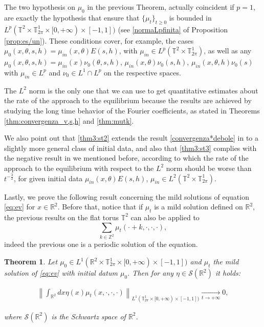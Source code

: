 \documentclass[a4paper,10pt,reqno]{amsart}
\newtheorem{theorem}{Theorem}[section]
\numberwithin{equation}{subsection}
\numberwithin{figure}{subsection}
\begin{document}
The two hypothesis on $\mu_0$ in the previous Theorem, actually coincident if $p=1$, are exactly the hypothesis that ensure that $\{\mu_t\}_{t\geq0}$ is bounded in $L^p(\mathbb{T}^2\times\mathbb{T}^1_{2\pi}\times[0,+\infty)\times[-1,1])$ (see \eqref{normaLpfinita} of Proposition \ref{prop:es/un}). These conditions cover, for example, the cases $\mu_0(x,\theta,s,h)=\mu_{in}(x,\theta)E(s,h)$, with $\mu_{in}\in L^p(\mathbb{T}^2\times\mathbb{T}^1_{2\pi})$, as well as any $\mu_0(x,\theta,s,h)=\mu_{in}(x)\nu_0(\theta,s,h)$, $\mu_{in}(x,\theta)\nu_0(s,h)$, $\mu_{in}(x,\theta,h)\nu_0(s)$ with $\mu_{in}\in L^p$ and $\nu_0\in L^1\cap L^p$ on the respective spaces.

The $L^2$ norm is the only one that we can use to get quantitative estimates about the rate of the approach to the equilibrium because the results are achieved by studying the long time behavior of the Fourier coefficients, as stated in Theorems \ref{thm:convergenza_v,s,h} and \ref{thm:mutk}.

We also point out that \eqref{thm3:st2} extends the result \eqref{convergenza*debole} in \cite{CG2010} to a slightly more general class of initial data, and also that \eqref{thm3:st3} complies with the negative result in \cite{CG2010} we mentioned before, according to which the rate of the approach to the equilibrium with respect to the $L^2$ norm should be worse than $t^{-\frac{3}{2}}$, for given initial data $\mu_{in}(x,\theta)E(s,h)$, $\mu_{in}\in L^2(\mathbb{T}^2\times\mathbb{T}^1_{2\pi})$.

Lastly, we prove the following result concerning the mild solutions of equation \eqref{eq:ev} for $x\in\mathbb{R}^2$. Before that, notice that if $\mu_t$ is a mild solution defined on $\mathbb{R}^2$, the previous results on the flat torus $\mathbb{T}^2$ can also be applied to 
\[
\sum_{k\in\mathbb{Z}^2}\mu_t(\cdot+k,\cdot,\cdot,\cdot),
\]
indeed the previous one is a periodic solution of the equation.
\begin{theorem}\label{thm:conv_R2}
Let $\mu_0\in L^1(\mathbb{R}^2\times\mathbb{T}^1_{2\pi}\times[0,+\infty)\times[-1,1])$ and $\mu_t$ the mild solution of  \eqref{eq:ev} with initial datum $\mu_0$. Then for any $\eta\in{\mathcal S}(\mathbb{R}^2)$ it holds:

\begin{align*}
\left\|\int_{\mathbb{R}^2}dx\eta(x)\mu_t(x,\cdot,\cdot,\cdot)\right\|_{L^1(\mathbb{T}^1_{2\pi}\times[0,+\infty)\times[-1,1])}\xrightarrow[t\to+\infty]{}0,
\end{align*}

where ${\mathcal S}(\mathbb{R}^2)$ is the Schwartz space of $\mathbb{R}^2$.
\end{theorem}
\end{document}
